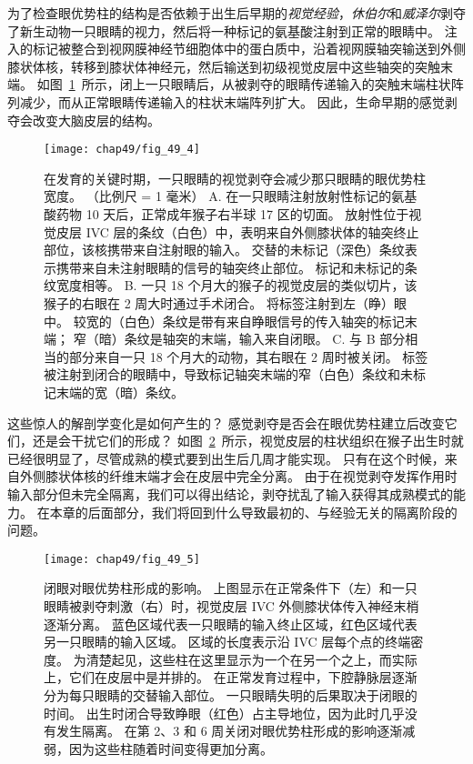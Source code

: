 为了检查眼优势柱的结构是否依赖于出生后早期的\textit{视觉经验}，\textit{休伯尔}和\textit{威泽尔}剥夺了新生动物一只眼睛的视力，然后将一种标记的氨基酸注射到正常的眼睛中。
注入的标记被整合到视网膜神经节细胞体中的蛋白质中，沿着视网膜轴突输送到外侧膝状体核，转移到膝状体神经元，然后输送到初级视觉皮层中这些轴突的突触末端。
如图~\ref{fig:49_4}~所示，闭上一只眼睛后，从被剥夺的眼睛传递输入的突触末端柱状阵列减少，而从正常眼睛传递输入的柱状末端阵列扩大。
因此，生命早期的感觉剥夺会改变大脑皮层的结构。


\begin{figure}[htbp]
	\centering
	\texttt{[image: chap49/fig\_49\_4]}
	\caption{在发育的关键时期，一只眼睛的视觉剥夺会减少那只眼睛的眼优势柱宽度。
		（比例尺 = 1 毫米）\cite{hubel1977ferrier}
		A. 在一只眼睛注射放射性标记的氨基酸药物 10 天后，正常成年猴子右半球 17 区的切面。
		放射性位于视觉皮层 IVC 层的条纹（白色）中，表明来自外侧膝状体的轴突终止部位，该核携带来自注射眼的输入。
		交替的未标记（深色）条纹表示携带来自未注射眼睛的信号的轴突终止部位。
		标记和未标记的条纹宽度相等。
		B. 一只 18 个月大的猴子的视觉皮层的类似切片，该猴子的右眼在 2 周大时通过手术闭合。
		将标签注射到左（睁）眼中。
		较宽的（白色）条纹是带有来自睁眼信号的传入轴突的标记末端； 窄（暗）条纹是轴突的末端，输入来自闭眼。
		C. 与 B 部分相当的部分来自一只 18 个月大的动物，其右眼在 2 周时被关闭。
		标签被注射到闭合的眼睛中，导致标记轴突末端的窄（白色）条纹和未标记末端的宽（暗）条纹。}
	\label{fig:49_4}
\end{figure}


这些惊人的解剖学变化是如何产生的？
感觉剥夺是否会在眼优势柱建立后改变它们，还是会干扰它们的形成？
如图~\ref{fig:49_5}~所示，视觉皮层的柱状组织在猴子出生时就已经很明显了，尽管成熟的模式要到出生后几周才能实现。
只有在这个时候，来自外侧膝状体核的纤维末端才会在皮层中完全分离。
由于在视觉剥夺发挥作用时输入部分但未完全隔离，我们可以得出结论，剥夺扰乱了输入获得其成熟模式的能力。
在本章的后面部分，我们将回到什么导致最初的、与经验无关的隔离阶段的问题。


\begin{figure}[htbp]
	\centering
	\texttt{[image: chap49/fig\_49\_5]}
	\caption{闭眼对眼优势柱形成的影响。
		上图显示在正常条件下（左）和一只眼睛被剥夺刺激（右）时，视觉皮层 IVC 外侧膝状体传入神经末梢逐渐分离。
		蓝色区域代表一只眼睛的输入终止区域，红色区域代表另一只眼睛的输入区域。
		区域的长度表示沿 IVC 层每个点的终端密度。
		为清楚起见，这些柱在这里显示为一个在另一个之上，而实际上，它们在皮层中是并排的。
		在正常发育过程中，下腔静脉层逐渐分为每只眼睛的交替输入部位。
		一只眼睛失明的后果取决于闭眼的时间。
		出生时闭合导致睁眼（红色）占主导地位，因为此时几乎没有发生隔离。
		在第 2、3 和 6 周关闭对眼优势柱形成的影响逐渐减弱，因为这些柱随着时间变得更加分离\cite{hubel1977ferrier}。 }
	\label{fig:49_5}
\end{figure}



